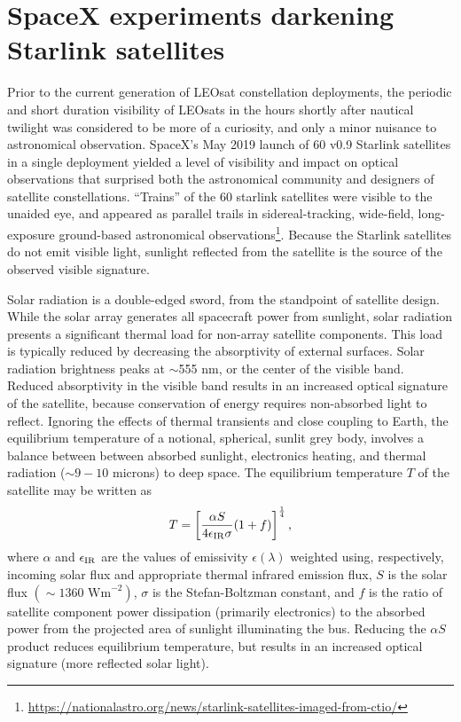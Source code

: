 \documentclass[twocolumn,trackchanges]{aastex63}
\begin{document}
\newpage

\section{SpaceX experiments darkening Starlink satellites}
\label{sec:spacex-dark}

Prior to the current generation of LEOsat constellation deployments, the periodic and short duration visibility of LEOsats in the hours shortly after nautical twilight was considered to be more of a curiosity, and only a minor nuisance to astronomical observation.
SpaceX's May 2019 launch of 60 v0.9 Starlink satellites in a single deployment yielded a level of visibility and impact on optical observations that surprised both the astronomical community and designers of satellite constellations. ``Trains'' of the 60 starlink satellites were visible to the unaided eye, and appeared as parallel trails in sidereal-tracking, wide-field, long-exposure ground-based astronomical observations\footnote{\url{https://nationalastro.org/news/starlink-satellites-imaged-from-ctio/}}. Because the Starlink satellites do not emit visible light, sunlight reflected from the satellite is the source of the observed visible signature.

Solar radiation is a double-edged sword, from the standpoint of satellite design. While the solar array generates all spacecraft power from sunlight, solar radiation presents a significant thermal load for non-array satellite components.  This load is typically reduced by decreasing the absorptivity of external surfaces. Solar radiation brightness peaks at $\sim$555 nm, or the center of the visible band.  Reduced absorptivity in the visible band results in an increased optical signature of the satellite, because conservation of energy requires non-absorbed light to reflect.  Ignoring the effects of thermal transients and close coupling to Earth, the equilibrium temperature of a notional, spherical, sunlit grey body, involves a balance between between absorbed sunlight, electronics heating, and thermal radiation ($\sim9-10$ microns) to deep space. The equilibrium temperature $T$ of the satellite may be written as
\begin{equation}
T = \left[\frac{\alpha S}{4\epsilon_{\rm IR} \sigma}(1+f)\right]^\frac{1}{4},
\end{equation}\label{starlink-temp}
\noindent where $\alpha$ and $\epsilon_{\rm IR}$ are the values of emissivity $\epsilon(\lambda)$ weighted using, respectively, incoming solar flux and appropriate thermal infrared emission flux, $S$ is the solar flux $(\sim1360 \textrm{ Wm}^{-2})$, $\sigma$ is the Stefan-Boltzman constant, and $f$ is the ratio of satellite component power dissipation (primarily electronics) to the absorbed power from the projected area of sunlight illuminating the bus. Reducing the $\alpha S$ product reduces equilibrium temperature, but results in an increased optical signature (more reflected solar light).
\end{document}
